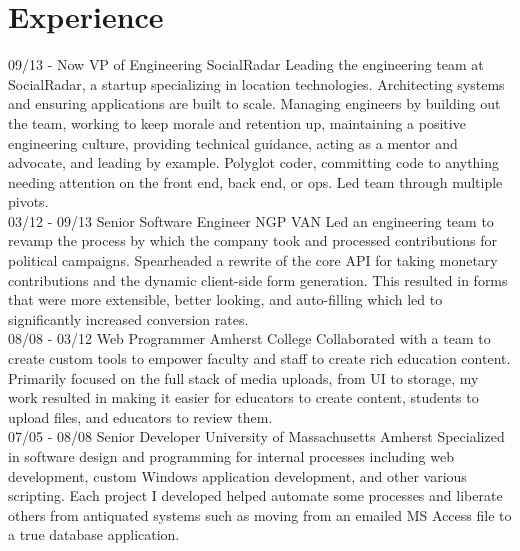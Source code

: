 \documentclass[]{friggeri-cv}
\begin{document}
\section{Experience}
\begin{entrylist}
  \entry
    {09/13 - Now}
    {VP of Engineering}
    {SocialRadar}
    {Leading the engineering team at SocialRadar, a startup specializing in location technologies. Architecting systems and ensuring applications are built to scale. Managing engineers by building out the team, working to keep morale and retention up, maintaining a positive engineering culture, providing technical guidance, acting as a mentor and advocate, and leading by example. Polyglot coder, committing code to anything needing attention on the front end, back end, or ops. Led team through multiple pivots.\\}
  \entry
    {03/12 - 09/13}
    {Senior Software Engineer}
    {NGP VAN}
    {Led an engineering team to revamp the process by which the company took and processed contributions for political campaigns. Spearheaded a rewrite of the core API for taking monetary contributions and the dynamic client-side form generation. This resulted in forms that were more extensible, better looking, and auto-filling which led to significantly increased conversion rates.\\}
    \entry
    {08/08 - 03/12}
    {Web Programmer}
    {Amherst College}
    {Collaborated with a team to create custom tools to empower faculty and staff to create rich education content. Primarily focused on the full stack of media uploads, from UI to storage, my work resulted in making it easier for educators to create content, students to upload files, and educators to review them.\\}
    \entry
    {07/05 - 08/08}
    {Senior Developer}
    {University of Massachusetts Amherst}
    {Specialized in software design and programming for internal processes including web development, custom Windows application development, and other various scripting. Each project I developed helped automate some processes and liberate others from antiquated systems such as moving from an emailed MS Access file to a true database application.}
\end{entrylist}
\\
\end{document}
